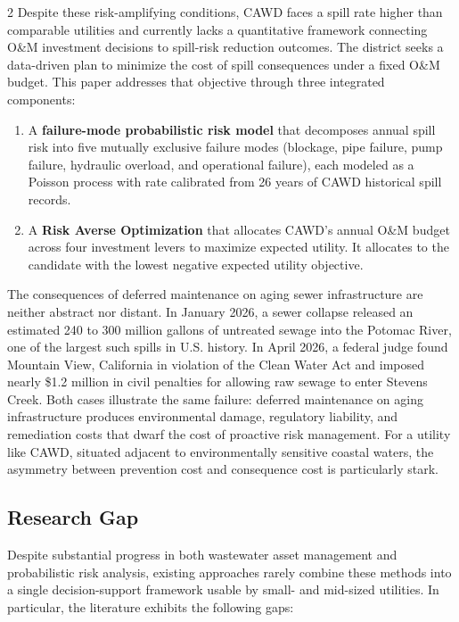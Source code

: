 \documentclass[10pt]{article}
\begin{document}
\begin{multicols}{2}
Despite these risk-amplifying conditions, CAWD faces a spill rate higher
than comparable utilities and currently lacks a quantitative framework
connecting O\&M investment decisions to spill-risk reduction outcomes. The
district seeks a data-driven plan to minimize the cost of spill
consequences under a fixed O\&M budget. This paper addresses that objective
through three integrated components:
 
\begin{enumerate}[leftmargin=*]
    \item A \textbf{failure-mode probabilistic risk model} that decomposes
    annual spill risk into five mutually exclusive failure modes (blockage,
    pipe failure, pump failure, hydraulic overload, and operational failure),
    each modeled as a Poisson process with rate calibrated from 26 years of
    CAWD historical spill records.
 
    \item A \textbf{Risk Averse Optimization} that allocates CAWD's
    annual O\&M budget across four investment levers to maximize expected utility. It allocates to the candidate with the lowest negative expected utility objective. 
\end{enumerate}
 
The consequences of deferred maintenance on aging sewer infrastructure are
neither abstract nor distant. In January 2026, a sewer collapse released an
estimated 240 to 300 million gallons of untreated sewage into the Potomac
River, one of the largest such spills in U.S. history. In April 2026, a
federal judge found Mountain View, California in violation of the Clean
Water Act and imposed nearly \$1.2 million in civil penalties for allowing
raw sewage to enter Stevens Creek. Both cases illustrate the same failure:
deferred maintenance on aging infrastructure produces environmental damage,
regulatory liability, and remediation costs that dwarf the cost of
proactive risk management. For a utility like CAWD, situated adjacent to
environmentally sensitive coastal waters, the asymmetry between prevention
cost and consequence cost is particularly stark.
 
\subsection{Research Gap}
 
Despite substantial progress in both wastewater asset management and
probabilistic risk analysis, existing approaches rarely combine these
methods into a single decision-support framework usable by small- and
mid-sized utilities. In particular, the literature exhibits the following
gaps:
 

\end{multicols}
\end{document}
